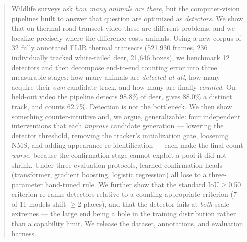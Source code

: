 \begin{abstract}
Wildlife surveys ask \emph{how many animals are there}, but the computer-vision pipelines
built to answer that question are optimized as \emph{detectors}. We show that on thermal
road-transect video these are different problems, and we localize precisely where the
difference costs animals. Using a new corpus of 32 fully annotated FLIR thermal transects
(521,930 frames, 236 individually tracked white-tailed deer, 21,646 boxes), we benchmark 12
detectors and then decompose end-to-end counting error into three measurable stages: how
many animals are \emph{detected at all}, how many acquire their \emph{own} candidate track,
and how many are finally \emph{counted}. On held-out video the pipeline detects 98.8\% of
deer, gives 88.0\% a distinct track, and counts 62.7\%. Detection is not the bottleneck.
We then show something counter-intuitive and, we argue, generalizable: four independent
interventions that each \emph{improve} candidate generation --- lowering the detector
threshold, removing the tracker's initialization gate, loosening NMS, and adding appearance
re-identification --- each make the final count \emph{worse}, because the confirmation stage
cannot exploit a pool it did not shrink. Under three evaluation protocols, learned
confirmation heads (transformer, gradient boosting, logistic regression) all lose to a
three-parameter hand-tuned rule. We further show that the standard IoU$\geq$0.50 criterion
re-ranks detectors relative to a counting-appropriate criterion (7 of 11 models shift
$\geq$2 places), and that the detector fails at \emph{both} scale extremes --- the large end being a hole in the training distribution
rather than a capability limit. We release the dataset, annotations, and evaluation harness.
\end{abstract}
